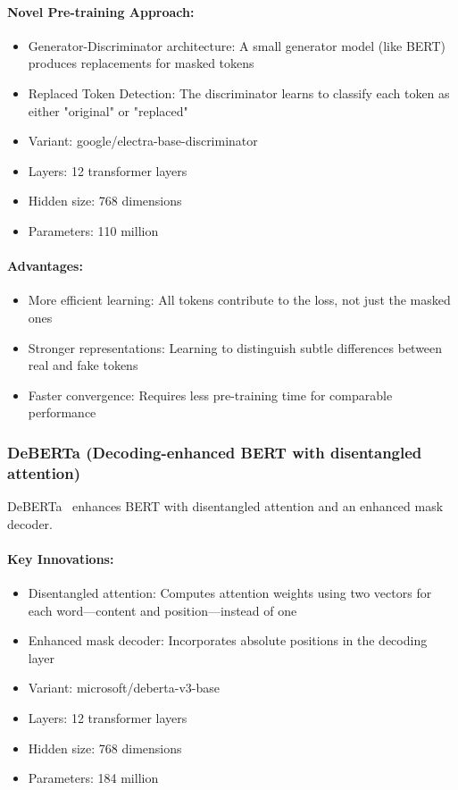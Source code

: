 \documentclass[12pt]{article}
\begin{document}
\paragraph{Novel Pre-training Approach:}
\begin{itemize}
    \item Generator-Discriminator architecture: A small generator model (like BERT) produces replacements for masked tokens
    \item Replaced Token Detection: The discriminator learns to classify each token as either "original" or "replaced"
    \item Variant: google/electra-base-discriminator
    \item Layers: 12 transformer layers
    \item Hidden size: 768 dimensions
    \item Parameters: 110 million
\end{itemize}

\paragraph{Advantages:}
\begin{itemize}
    \item More efficient learning: All tokens contribute to the loss, not just the masked ones
    \item Stronger representations: Learning to distinguish subtle differences between real and fake tokens
    \item Faster convergence: Requires less pre-training time for comparable performance
\end{itemize}

\subsubsection{DeBERTa (Decoding-enhanced BERT with disentangled attention)}
DeBERTa~\cite{he2020deberta} enhances BERT with disentangled attention and an enhanced mask decoder.

\paragraph{Key Innovations:}
\begin{itemize}
    \item Disentangled attention: Computes attention weights using two vectors for each word—content and position—instead of one
    \item Enhanced mask decoder: Incorporates absolute positions in the decoding layer
    \item Variant: microsoft/deberta-v3-base
    \item Layers: 12 transformer layers
    \item Hidden size: 768 dimensions
    \item Parameters: 184 million
\end{itemize}
\end{document}
